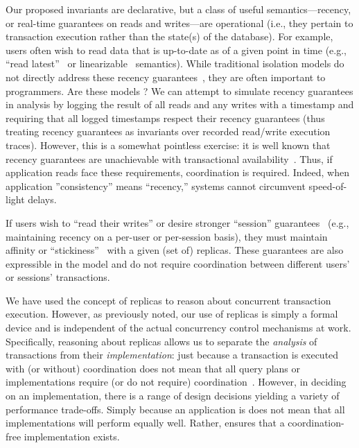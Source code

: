 Our proposed invariants are
declarative, but a class of useful semantics---recency, or real-time
guarantees on reads and writes---are operational (i.e., they pertain
to transaction execution rather than the state(s) of the
database). For example, users often wish to read data that is
up-to-date as of a given point in time (e.g., ``read
latest''~\cite{pnuts} or linearizable~\cite{gilbert-cap}
semantics). While traditional isolation models do not directly address
these recency guarantees~\cite{adya-isolation}, they are often
important to programmers. Are these models \iconfluent? We can attempt
to simulate recency guarantees in \iconfluence analysis by logging the
result of all reads and any writes with a timestamp and requiring that
all logged timestamps respect their recency guarantees (thus treating
recency guarantees as invariants over recorded read/write execution
traces). However, this is a somewhat pointless exercise: it is well
known that recency guarantees are unachievable with transactional
availability~\cite{hat-vldb,gilbert-cap,davidson-survey}. Thus, if
application reads face these requirements, coordination is
required. Indeed, when application ''consistency'' means ``recency,''
systems cannot circumvent speed-of-light delays.

If users wish to ``read their writes'' or desire stronger ``session''
guarantees~\cite{bayou} (e.g., maintaining recency on a per-user or
per-session basis), they must maintain affinity or
``stickiness''~\cite{hat-vldb} with a given (set of) replicas. These
guarantees are also expressible in the \iconfluence model and do
not require coordination between different users' or sessions'
transactions.

 We have used the concept
of replicas to reason about concurrent transaction execution. However,
as previously noted, our use of replicas is simply a formal device and
is independent of the actual concurrency control mechanisms at
work. Specifically, reasoning about replicas allows us to separate the
\textit{analysis} of transactions from their \textit{implementation}:
just because a transaction is executed with (or without) coordination
does not mean that all query plans or implementations require (or do
not require) coordination~\cite{hat-vldb}. However, in deciding on an
implementation, there is a range of design decisions yielding a
variety of performance trade-offs. Simply because an application is
\iconfluent does not mean that all implementations will perform
equally well. Rather, \iconfluence ensures that a coordination-free
implementation exists.

